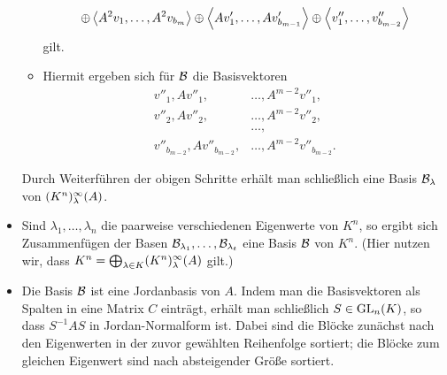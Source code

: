 \begin{itemize}[resume]
\begin{itemize}
\begin{align*}
            \oplus  \left\langle  A^2 v_1, \dotsc, A^2 v_{b_m}  \right\rangle
            \oplus  \left\langle  A v'_1, \dotsc, A v'_{b_{m-1}}  \right\rangle
            \oplus  \left\langle  v''_1, \dotsc, v''_{b_{m-2}}  \right\rangle
        \end{align*}
        gilt.
      \item
        Hiermit ergeben sich für $\mathcal{B}$ die Basisvektoren
        \begin{align*}
          v''_1,         A v''_1,         &\dotsc, A^{m-2} v''_1,         \\
          v''_2,         A v''_2,         &\dotsc, A^{m-2} v''_2,         \\
                                          &\dotsc,                        \\
          v''_{b_{m-2}}, A v''_{b_{m-2}}, &\dotsc, A^{m-2} v''_{b_{m-2}}.
        \end{align*}
    \end{itemize}
    Durch Weiterführen der obigen Schritte erhält man schließlich eine Basis $\mathcal{B}_\lambda$ von $(K^n)_{\lambda}^{\infty}(A)$.
    
  \item
    Sind $\lambda_1, \dotsc, \lambda_n$ die paarweise verschiedenen Eigenwerte von $K^n$, so ergibt sich Zusammenfügen der Basen $\mathcal{B}_{\lambda_1}, \dotsc, \mathcal{B}_{\lambda_t}$ eine Basis $\mathcal{B}$ von $K^n$.
    (Hier nutzen wir, dass $K^n = \bigoplus_{\lambda \in K} (K^n)_{\lambda}^{\infty}(A)$ gilt.)
 
  \item
    Die Basis $\mathcal{B}$ ist eine Jordanbasis von $A$.
    Indem man die Basisvektoren als Spalten in eine Matrix $C$ einträgt, erhält man schließlich $S \in \operatorname{GL}_{n}(K)$, so dass $S^{-1} A S$ in Jordan-Normalform ist.
    Dabei sind die Blöcke zunächst nach den Eigenwerten in der zuvor gewählten Reihenfolge sortiert;
    die Blöcke zum gleichen Eigenwert sind nach absteigender Größe sortiert.
\end{itemize}

